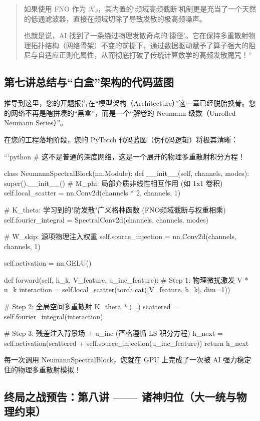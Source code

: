 \documentclass[12pt]{article}
\begin{document}
{\begin{quote}
如果使用 FNO 作为 $\mathcal{K}_{\theta}$，其内置的‘频域高频截断’机制更是充当了一个天然的低通滤波器，直接在频域切除了导致发散的极高频噪声。

也就是说，AI 找到了一条绕过物理发散奇点的‘捷径’。它在保持多重散射物理拓扑结构（网络骨架）不变的前提下，通过数据驱动赋予了算子强大的阻尼与自适应正则化属性，从而彻底打破了传统计算数学的高频发散魔咒！”
\end{quote}

\subsection{第七讲总结与“白盒”架构的代码蓝图}

推导到这里，您的开题报告在“模型架构（Architecture）”这一章已经脱胎换骨。您的网络不再是瞎拼凑的“黑盒”，而是一个“解卷的 Neumann 级数（Unrolled Neumann Series）”。

在您的工程落地阶段，您的 PyTorch 代码蓝图（伪代码逻辑）将极其清晰：

```python
# 这不是普通的深度网络，这是一个展开的物理多重散射积分方程！

class NeumannSpectralBlock(nn.Module):
    def __init__(self, channels, modes):
        super().__init__()
        # M_phi: 局部介质非线性相互作用 (如 1x1 卷积)
        self.local_scatter = nn.Conv2d(channels * 2, channels, 1)

        # K_theta: 学习到的"防发散"广义格林函数 (FNO频域截断与权重相乘)
        self.fourier_integral = SpectralConv2d(channels, channels, modes)

        # W_skip: 源项物理注入权重
        self.source_injection = nn.Conv2d(channels, channels, 1)

        self.activation = nn.GELU()

    def forward(self, h_k, V_feature, u_inc_feature):
        # Step 1: 物理微扰激发 V * u_k
        interaction = self.local_scatter(torch.cat([V_feature, h_k], dim=1))

        # Step 2: 全局空间多重散射 K_theta * (...)
        scattered = self.fourier_integral(interaction)

        # Step 3: 残差注入背景场 + u_inc (严格遵循 LS 积分方程)
        h_next = self.activation(scattered + self.source_injection(u_inc_feature))
        return h_next

每一次调用 NeumannSpectralBlock，您就在 GPU 上完成了一次被 AI 强力稳定住的物理多重散射模拟！

\subsection{终局之战预告：第八讲 —— 诸神归位（大一统与物理约束）}

}
\end{document}
